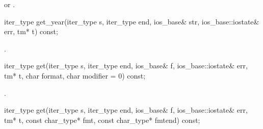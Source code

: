 \begin{itemdescr}
\pnum
\returns
{}
or
.
\end{itemdescr}

%
\begin{itemdecl}
iter_type get_year(iter_type s, iter_type end, ios_base& str,
                   ios_base::iostate& err, tm* t) const;
\end{itemdecl}

\begin{itemdescr}
\pnum
\returns
{}.
\end{itemdescr}

%
\begin{itemdecl}
iter_type get(iter_type s, iter_type end, ios_base& f, ios_base::iostate& err,
              tm* t, char format, char modifier = 0) const;
\end{itemdecl}

\begin{itemdescr}
\pnum
\returns
{}.
\end{itemdescr}

%
\begin{itemdecl}
iter_type get(iter_type s, iter_type end, ios_base& f, ios_base::iostate& err,
              tm* t, const char_type* fmt, const char_type* fmtend) const;
\end{itemdecl}

